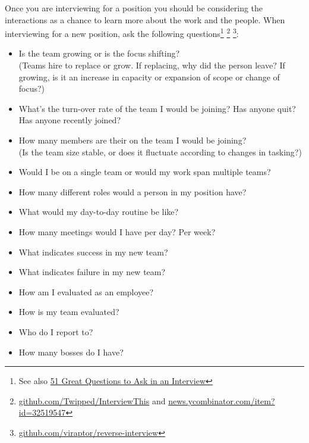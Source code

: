 Once you are interviewing for a position you should be considering the interactions as a chance to learn more about the work and the people. When interviewing for a new position, ask the following questions\footnote{See also \href{https://www.themuse.com/advice/51-interview-questions-you-should-be-asking}{51 Great Questions to Ask in an Interview}}
\footnote{
\href{https://github.com/Twipped/InterviewThis}{github.com/Twipped/InterviewThis} and 
\href{https://news.ycombinator.com/item?id=32519547}{news.ycombinator.com/item?id=32519547}}
\footnote{
\href{https://github.com/viraptor/reverse-interview}{github.com/viraptor/reverse-interview}
}:
\begin{itemize}
    \item Is the team growing or is the focus shifting? \\
    (Teams hire to replace or grow. If replacing, why did the person leave? If growing, is it an increase in capacity or expansion of scope or change of focus?)
    \item What's the turn-over rate of the team I would be joining? Has anyone quit? Has anyone recently joined?
    \item How many members are their on the team I would be joining?\\
    (Is the team size stable, or does it fluctuate according to changes in tasking?)
    \item Would I be on a single team or would my work span multiple teams?
    \item How many different roles would a person in my position have? 
    
    \item What would my day-to-day routine be like?
    \item How many meetings would I have per day? Per week?

    \item What indicates success in my new team? 
    \item What indicates failure in my new team? 
    \item How am I evaluated as an employee?
    \item How is my team evaluated?

    \item Who do I report to? 
    \item How many bosses do I have?


\end{itemize}
